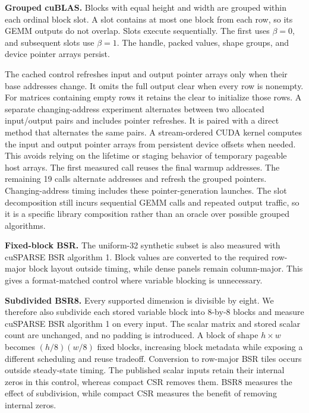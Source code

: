 \documentclass[10pt]{article}
\begin{document}
\textbf{Grouped cuBLAS.} Blocks with equal height and width are grouped within
each ordinal block slot. A slot contains at most one block from each row, so
its GEMM outputs do not overlap. Slots execute sequentially. The first uses
\(\beta=0\), and subsequent slots use \(\beta=1\). The handle, packed values,
shape groups, and device pointer arrays persist.

The cached control refreshes input and output pointer arrays only when their
base addresses change. It omits the full output clear when every row is
nonempty. For matrices containing empty rows it retains the clear to initialize
those rows. A separate changing-address experiment alternates between two
allocated input/output pairs and includes pointer refreshes. It is paired
with a direct method that alternates the same pairs. A stream-ordered CUDA kernel computes the input and output pointer arrays
from persistent device offsets when needed. This avoids relying on the
lifetime or staging behavior of temporary pageable host arrays.
The first measured call reuses the final warmup addresses. The remaining
19 calls alternate addresses and refresh the grouped pointers.
Changing-address timing includes these pointer-generation launches.
The slot decomposition still incurs sequential GEMM calls and repeated
output traffic, so it is a specific library composition rather than an
oracle over possible grouped algorithms.

\textbf{Fixed-block BSR.} The uniform-32 synthetic subset is also measured
with cuSPARSE BSR algorithm 1. Block values are converted to the required
row-major block layout outside timing, while dense panels remain column-major.
This gives a format-matched control where variable blocking is unnecessary.

\textbf{Subdivided BSR8.} Every supported dimension is divisible by eight.
We therefore also subdivide each stored variable block into 8-by-8 blocks
and measure cuSPARSE BSR algorithm 1 on every input. The scalar matrix and
stored scalar count are unchanged, and no padding is introduced. A block
of shape \(h\times w\) becomes \((h/8)(w/8)\) fixed blocks, increasing
block metadata while exposing a different scheduling and reuse tradeoff.
Conversion to row-major BSR tiles occurs outside steady-state timing.
The published scalar inputs retain their internal zeros in this control,
whereas compact CSR removes them. BSR8 measures the effect of subdivision, while compact CSR measures the
benefit of removing internal zeros.
\end{document}
